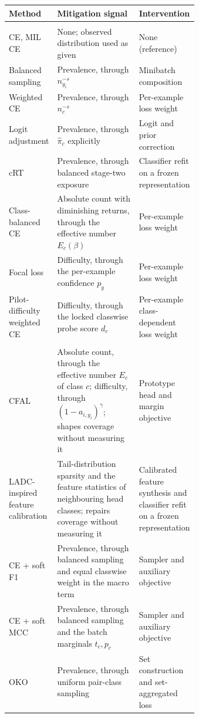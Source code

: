 \documentclass[11pt]{article}
\makeatletter
\newcommand{\regimehead}[2]{%
  \noalign{\vskip 2pt}%
  \rowcolor{gray!18}\multicolumn{3}{@{}l@{}}{\rule{0pt}{2.4ex}\textbf{#1}\enspace\textnormal{\itshape#2}}\\[1pt]}
\makeatother
\begin{document}
\begin{table}[ht]
  \centering
  \footnotesize
  \begin{tabularx}{\linewidth}{@{}>{\raggedright\arraybackslash}p{0.20\linewidth}>{\raggedright\arraybackslash}p{0.44\linewidth}>{\raggedright\arraybackslash}X@{}}
    \toprule
    Method & Mitigation signal & Intervention \\
    \midrule
    \regimehead{Both regimes}{patch and WSI-bag}
    CE, MIL CE & None; observed distribution used as given & None (reference) \\
    Balanced sampling & Prevalence, through $n_{y_i}^{-s}$ & Minibatch composition \\
    Weighted CE & Prevalence, through $n_c^{-s}$ & Per-example loss weight \\
    Logit adjustment & Prevalence, through $\widehat{\pi}_c$ explicitly & Logit and prior correction \\
    cRT & Prevalence, through balanced stage-two exposure & Classifier refit on a frozen representation \\
    Class-balanced CE & Absolute count with diminishing returns, through the effective number $E_c(\beta)$ & Per-example loss weight \\
    Focal loss & Difficulty, through the per-example confidence $p_y$ & Per-example loss weight \\
    Pilot-difficulty weighted CE & Difficulty, through the locked classwise probe score $d_c$ & Per-example class-dependent loss weight \\
    \regimehead{Patch regime}{only}
    CFAL & Absolute count, through the effective number $E_c$ of class $c$; difficulty, through $(1-a_{i,y_i})^{\gamma}$; shapes coverage without measuring it & Prototype head and margin objective \\
    LADC-inspired feature calibration & Tail-distribution sparsity and the feature statistics of neighbouring head classes; repairs coverage without measuring it & Calibrated feature synthesis and classifier refit on a frozen representation \\
    CE + soft F1 & Prevalence, through balanced sampling and equal classwise weight in the macro term & Sampler and auxiliary objective \\
    CE + soft MCC & Prevalence, through balanced sampling and the batch marginals $t_c,p_c$ & Sampler and auxiliary objective \\
    OKO & Prevalence, through uniform pair-class sampling & Set construction and set-aggregated loss \\

\end{tabularx}
\end{table}
\end{document}
